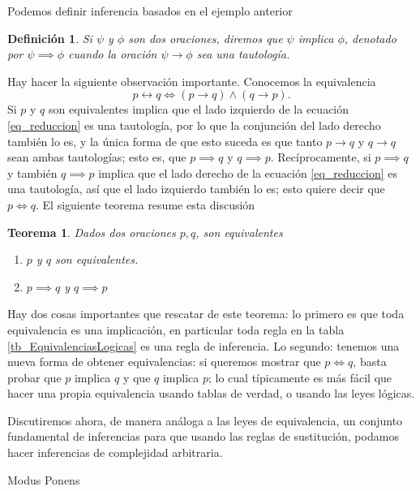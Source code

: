 \documentclass{book}
\newtheorem{df}{Definición}[chapter]
\newtheorem{thm}{Teorema}[chapter]
\begin{document}
Podemos definir inferencia basados en el ejemplo anterior
\begin{df}
	Si $\psi$ y $\phi$ son dos oraciones, diremos que $\psi$ implica $\phi$, denotado por $\psi \implies \phi$ cuando la oración $\psi \rightarrow \phi$ sea una tautología. 
\end{df}
Hay hacer la siguiente observación importante. 
Conocemos la equivalencia 
\begin{equation}\label{eq_reduccion}
	p \leftrightarrow q \iff (p \rightarrow q) \wedge (q \rightarrow p).
\end{equation}
Si $p$ y $q$ son equivalentes implica que el lado izquierdo de la ecuación \ref{eq_reduccion} es una tautología, por lo que la conjunción del lado derecho también lo es, y la única forma de que esto suceda es que tanto $p \rightarrow q$ y $q\rightarrow q$ sean ambas tautologías; esto es, que $p\implies q$ y $q \implies p$.
Recíprocamente, si $p \implies q$ y también $q \implies p$ implica que el lado derecho de la ecuación \ref{eq_reduccion} es una tautología, así que el lado izquierdo también lo es; esto quiere decir que $p\iff q$.
El siguiente teorema resume esta discusión
\begin{thm}
	Dados dos oraciones $p,q$, son equivalentes
	\begin{enumerate}
		\item $p$ y $q$ son equivalentes.
		\item $p \implies q$ y $q \implies p$
	\end{enumerate}
\end{thm}
Hay dos cosas importantes que rescatar de este teorema:
lo primero es que toda equivalencia es una implicación, en particular toda regla en la tabla \ref{tb_EquivalenciasLogicas} es una regla de inferencia.
Lo segundo: tenemos una nueva forma de obtener equivalencias: si queremos mostrar que $p \iff q$, basta probar que $p$ implica $q$ y que $q$ implica $p$; lo cual típicamente es más fácil que hacer una propia equivalencia usando tablas de verdad, o usando las leyes lógicas.

Discutiremos ahora, de manera análoga a las leyes de equivalencia, un conjunto fundamental de inferencias para que usando las reglas de sustitución, podamos hacer inferencias de complejidad arbitraria.
\begin{description}
	\item[Modus Ponens] %
\end{description}
\end{document}
